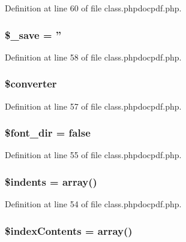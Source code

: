 \-Definition at line 60 of file class.\-phpdocpdf.\-php.

\hypertarget{classphpdocpdf_ab9befc6a4ff6463cf544012c09097c11}{
\subsubsection[{\$\-\_\-save}]{\setlength{\rightskip}{0pt plus 5cm}\$\-\_\-save = ''}}\label{classphpdocpdf_ab9befc6a4ff6463cf544012c09097c11}


\-Definition at line 58 of file class.\-phpdocpdf.\-php.

\hypertarget{classphpdocpdf_afe855bed1378ec1af29ce232a1b7b850}{
\subsubsection[{\$converter}]{\setlength{\rightskip}{0pt plus 5cm}\$converter}}\label{classphpdocpdf_afe855bed1378ec1af29ce232a1b7b850}


\-Definition at line 57 of file class.\-phpdocpdf.\-php.

\hypertarget{classphpdocpdf_a06be9cafb55b954edd7136b6cadedc8d}{
\subsubsection[{\$font\-\_\-dir}]{\setlength{\rightskip}{0pt plus 5cm}\$font\-\_\-dir = false}}\label{classphpdocpdf_a06be9cafb55b954edd7136b6cadedc8d}


\-Definition at line 55 of file class.\-phpdocpdf.\-php.

\hypertarget{classphpdocpdf_a5d445fd9cf0eabfcf384208e4c4b21e0}{
\subsubsection[{\$indents}]{\setlength{\rightskip}{0pt plus 5cm}\$indents = array()}}\label{classphpdocpdf_a5d445fd9cf0eabfcf384208e4c4b21e0}


\-Definition at line 54 of file class.\-phpdocpdf.\-php.

\hypertarget{classphpdocpdf_aa2bd60a8431bd94e4bb0886b33a2d2f1}{
\subsubsection[{\$index\-Contents}]{\setlength{\rightskip}{0pt plus 5cm}\$index\-Contents = array()}}\label{classphpdocpdf_aa2bd60a8431bd94e4bb0886b33a2d2f1}


